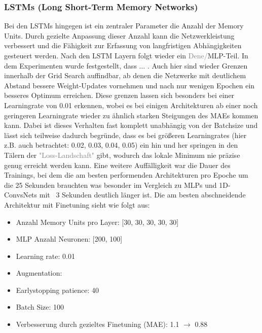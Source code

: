 \documentclass[manuscript,screen,review]{acmart} %
\begin{document}

\subsubsection*{LSTMs (Long Short-Term Memory Networks)}
Bei den LSTMs hingegen ist ein zentraler Parameter die Anzahl der Memory Units. Durch gezielte Anpassung dieser Anzahl kann die Netzwerkleistung verbessert und die Fähigkeit zur Erfassung von langfristigen Abhängigkeiten gesteuert werden. Nach den LSTM Layern folgt wieder ein \textcolor{gray}{Dene/}MLP-Teil. 
In dem Experimenten wurde festgestellt, dass ... .
Auch hier sind wieder Grenzen innerhalb der Grid Search auffindbar, ab denen die Netzwerke mit deutlichem Abstand bessere Weight-Updates vornehmen und nach nur wenigen Epochen ein besseres Optimum erreichen. Diese grenzen lassen sich besonders bei einer Learningrate von 0.01 erkennen, wobei es bei einigen Architekturen ab einer noch geringeren Learningrate wieder zu ähnlich starken Steigungen des MAEs kommen kann. Dabei ist dieses Verhalten fast komplett unabhängig von der Batchsize und lässt sich teilweise dadurch begründe, dass es bei größeren Learningrates (hier z.B. auch betrachtet: 0.02, 0.03, 0.04, 0.05) ein hin und her springen in den Tälern der \textcolor{gray}{"Loss-Landschaft"} gibt, wodurch das lokale Minimum nie präzise genug erreicht werden kann.
Eine weitere Auffälligkeit war die Dauer des Trainings, bei dem die am besten performenden Architekturen pro Epoche um die 25 Sekunden brauchten was besonder im Vergleich zu MLPs und 1D-ConvsNets mit ~3 Sekunden deutlich länger ist. 
Die am besten abschneidende Architektur mit Finetuning sieht wie folgt aus:
\begin{itemize}
    \item Anzahl Memory Units pro Layer: [30, 30, 30, 30, 30]
    \item MLP Anzahl Neuronen: [200, 100]
    \item Learning rate: 0.01
    \item Augmentation: 
    \item Earlystopping patience: 40
    \item Batch Size: 100
    \item Verbesserung durch gezieltes Finetuning (MAE): 1.1 $\rightarrow$ 0.88
\end{itemize}
\end{document}
